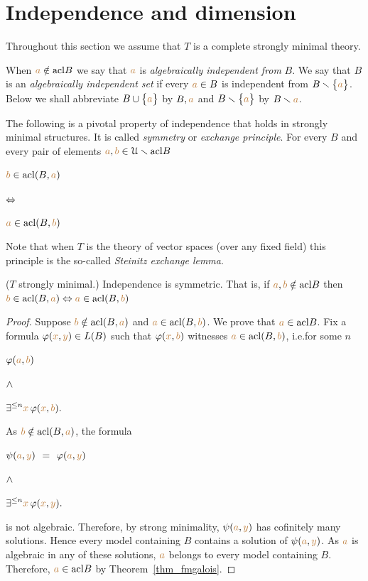 \section{Independence and dimension}
\def\medrel#1{\parbox[t]{5ex}{$\displaystyle\hfil #1$}}
\def\ceq#1#2#3{\parbox{35ex}{$\displaystyle #1$}\medrel{#2}$\displaystyle  #3$}


Throughout this section we assume that $T$ is a complete strongly minimal theory.

When ${\color{brown} a}\notin{\rm acl} B$ we say that ${\color{brown} a}$ is \emph{algebraically independent from\/} $B$.
We say that $B$ is an \emph{algebraically independent set\/} if every ${\color{brown} a}\in B$ is independent from $B\smallsetminus\big\{{\color{brown} a}\big\}$.
Below we shall abbreviate $B\cup\big\{{\color{brown} a}\big\}$ by \emph{$B,{\color{brown} a}$} and  $B\smallsetminus\big\{{\color{brown} a}\big\}$ by \emph{$B\smallsetminus{\color{brown}a}$}.

The following is a pivotal property of independence that holds in strongly minimal structures.
It is called \emph{symmetry\/} or \emph{exchange principle}.
For every $B$ and every pair of elements ${\color{brown} a},{\color{brown} b}\in\EuScript U\smallsetminus{\rm acl} B$

\ceq{\hfill {\mr b}\in\acl (B,{\mr a})}{\IFF}{{\mr a}\in\acl(B,{\mr b})}

Note that when $T$ is the theory of vector spaces (over any fixed field) this principle is the so-called \emph{Steinitz exchange lemma}.

\begin{theorem}\label{thm_exchange}
($T$ strongly minimal.) Independence is symmetric.
That is, if ${\color{brown} a},{\color{brown} b}\notin{\rm acl} B$ then ${\color{brown} b}\in{\rm acl} (B,{\color{brown} a})\Leftrightarrow{\color{brown}a}\in{\rm acl}(B,{\color{brown} b})$
\end{theorem} 

\begin{proof} 
Suppose ${\color{brown} b}\notin{\rm acl}(B,{\color{brown} a})$ and ${\color{brown} a}\in{\rm acl}(B,{\color{brown} b})$.
We prove that ${\color{brown} a}\in{\rm acl} B$.
Fix a formula $\varphi({\color{brown} x},{\color{brown} y})\in L(B)$ such that $\varphi({\color{brown} x},{\color{brown} b})$ witnesses ${\color{brown} a}\in{\rm acl}(B,{\color{brown} b})$, i.e.\@ for some $n$

\ceq{\hfill\phi({\mr a},{\mr b})}{\wedge}{\E^{\le n}{\mr x}\,\phi({\mr x},{\mr b}).}

As ${\color{brown} b}\notin{\rm acl}(B,{\color{brown} a})$, the formula

\ceq{\hfill\psi({\mr a},{\mr y})\medrel{=}\phi({\mr a},{\mr y})}{\wedge}{\E^{\le n}{\mr x}\,\phi({\mr x},{\mr y}).}

is not algebraic.
Therefore, by strong minimality, $\psi({\color{brown} a},{\color{brown} y})$ has cofinitely many solutions.
Hence every model containing $B$ contains a solution of $\psi({\color{brown} a},{\color{brown} y})$.
As ${\color{brown} a}$ is algebraic in any of these solutions, ${\color{brown} a}$ belongs to every model containing $B$.
Therefore, ${\color{brown} a}\in{\rm acl} B$ by Theorem~\ref{thm_fmgalois}.
\end{proof}


